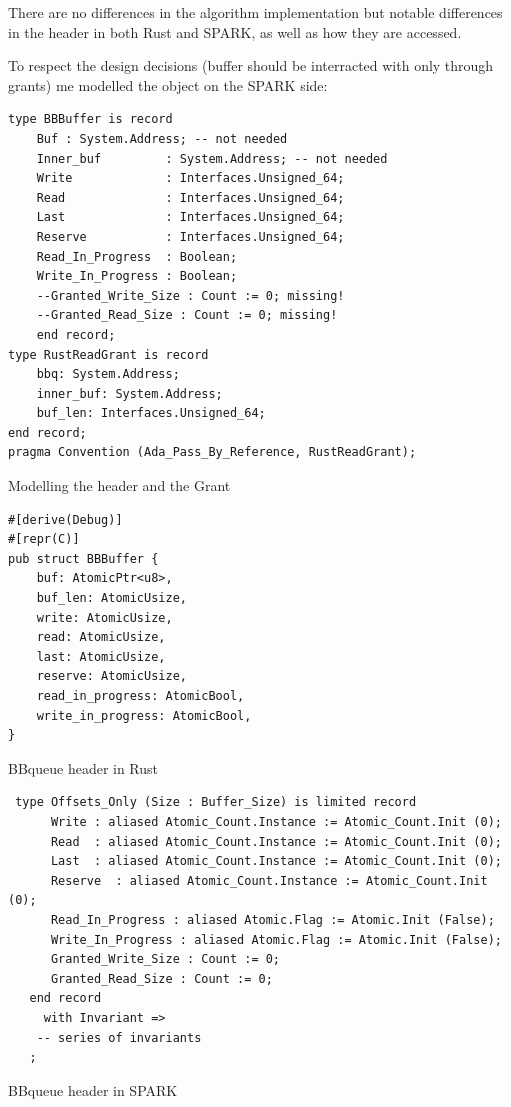 \documentclass[nomenclature, english, bibtex]{kththesis}
\begin{document}
There are no differences in the algorithm implementation but notable differences in the header in both Rust and SPARK, as well as how they are accessed.

To respect the design decisions (buffer should be interracted with only through grants) me modelled the object on the SPARK side:

\begin{listing}[ht!]
\begin{verbatim}
type BBBuffer is record
    Buf : System.Address; -- not needed
    Inner_buf         : System.Address; -- not needed
    Write             : Interfaces.Unsigned_64;
    Read              : Interfaces.Unsigned_64;
    Last              : Interfaces.Unsigned_64;
    Reserve           : Interfaces.Unsigned_64;
    Read_In_Progress  : Boolean;
    Write_In_Progress : Boolean;
    --Granted_Write_Size : Count := 0; missing!
    --Granted_Read_Size : Count := 0; missing!
    end record;
type RustReadGrant is record
    bbq: System.Address;
    inner_buf: System.Address;
    buf_len: Interfaces.Unsigned_64;
end record;
pragma Convention (Ada_Pass_By_Reference, RustReadGrant);
\end{verbatim}
\caption{Modelling the header and the Grant}
\label{lst:bbqueueinspark}
\end{listing}

\begin{listing}[!ht]
\begin{verbatim}
#[derive(Debug)]
#[repr(C)]
pub struct BBBuffer {
    buf: AtomicPtr<u8>,
    buf_len: AtomicUsize,
    write: AtomicUsize,
    read: AtomicUsize,
    last: AtomicUsize,
    reserve: AtomicUsize,
    read_in_progress: AtomicBool,
    write_in_progress: AtomicBool,
}
\end{verbatim}
\caption[BBqueue header in Rust]{BBqueue header in Rust}
\label{lst:rust_bbqueue_header}
\end{listing}

\begin{listing}[!ht]

\begin{verbatim}
 type Offsets_Only (Size : Buffer_Size) is limited record
      Write : aliased Atomic_Count.Instance := Atomic_Count.Init (0);
      Read  : aliased Atomic_Count.Instance := Atomic_Count.Init (0);
      Last  : aliased Atomic_Count.Instance := Atomic_Count.Init (0);
      Reserve  : aliased Atomic_Count.Instance := Atomic_Count.Init (0);
      Read_In_Progress : aliased Atomic.Flag := Atomic.Init (False);
      Write_In_Progress : aliased Atomic.Flag := Atomic.Init (False);
      Granted_Write_Size : Count := 0;
      Granted_Read_Size : Count := 0;
   end record
     with Invariant =>
    -- series of invariants
   ;
\end{verbatim}
\caption[BBqueue header in SPARK]{BBqueue header in SPARK}
\label{lst:SPARK_bbqueue_header}
\end{listing}
\end{document}
